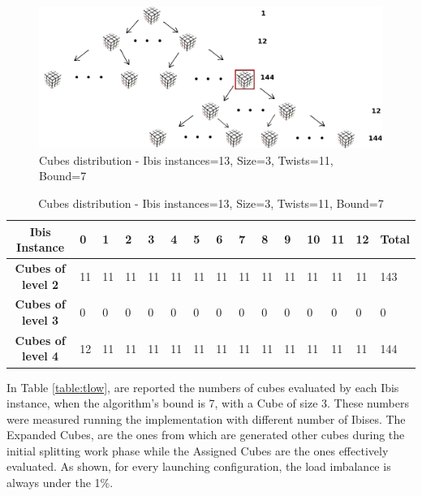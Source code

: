 \documentclass[a4paper]{article}
\begin{document}
\begin{figure}[!ht]
  \centering
  \includegraphics[width=0.7\linewidth]{rubik_tree_eval4}
  \caption{Cubes distribution - Ibis instances=13, Size=3, Twists=11, Bound=7}
  \label{fig:ev3}
\end{figure}
\FloatBarrier

\begin{table}[!ht]
\centering
\begin{tabular}{|l|l|l|l|l|l|l|l|l|l|l|l|l|l|l|}
\multicolumn{1}{|c||}{\bfseries Ibis Instance} & 0 & 1 & 2 & 3 & 4 & 5 & 6 & 7 & 8 & 9 & 10 & 11 & 12 & \multicolumn{1}{|c|}{\bfseries Total} \\ \hline
\multicolumn{1}{|c||}{\bfseries Cubes of level 2} & 11 & 11 & 11 & 11 & 11 & 11 & 11 & 11 & 11 & 11 & 11 & 11 & 11 & 143 \\ \hline
\multicolumn{1}{|c||}{\bfseries Cubes of level 3} & 0 & 0 & 0 & 0 & 0 & 0 & 0 & 0 & 0 & 0 & 0 & 0 & 0 & 0  \\ \hline
\multicolumn{1}{|c||}{\bfseries Cubes of level 4} & 12 & 11 & 11 & 11 & 11 & 11 & 11 & 11 & 11 & 11 & 11 & 11 & 11 & 144
\end{tabular}
\caption{Cubes distribution - Ibis instances=13, Size=3, Twists=11, Bound=7}
\label{table:tev3}
\end{table}
\FloatBarrier

In Table \ref{table:tlow}, are reported the numbers of cubes evaluated by each Ibis instance, when the algorithm's bound is 7, with a Cube of size 3. These numbers were measured running the implementation with different number of Ibises. The Expanded Cubes, are the ones from which are generated other cubes during the initial splitting work phase while the Assigned Cubes are the ones effectively evaluated. As shown, for every launching configuration, the load imbalance is always under the 1\%.
\end{document}
